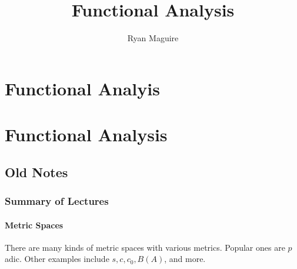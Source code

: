 \documentclass[crop=false,class=book,oneside]{standalone}
\begin{document}
    \ifx\ifmathcourses\undefined
        \title{Functional Analysis}
        \author{Ryan Maguire}
        \date{\vspace{-5ex}}
        \maketitle
        \tableofcontents
        \clearpage
        \chapter*{Functional Analyis}
        \setcounter{chapter}{1}
    \else
        \chapter{Functional Analysis}
    \fi
    \section{Old Notes}
        \subsection{Summary of Lectures}
            \subsubsection{Metric Spaces}
                There are many kinds of metric spaces with
                various metrics. Popular ones are $p$ adic.
                Other examples include $s,c,c_{0},B(A)$, and more.
\end{document}
